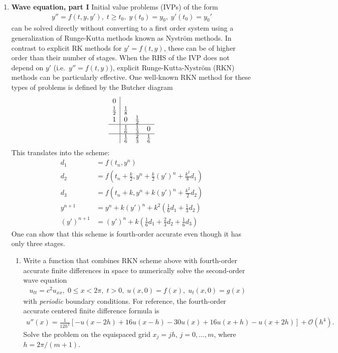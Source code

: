 \documentclass[final,oneside,onecolumn]{article}
\begin{document}
\begin{enumerate}
 \item \textbf{Wave equation, part I} Initial value problems (IVPs) of the form 
 \begin{align*}
 y'' = f(t,y,y'),\; t \geq t_0,\; y(t_0)=y_0,\; y'(t_0) = y_0'
 \end{align*}
 can be solved directly without converting to a first order system using a generalization of Runge-Kutta methods known as Nystr\"om methods. In contrast to explicit RK methods for $y'=f(t,y)$, these can be of higher order than  their number of stages.  When the RHS of the IVP does not depend on $y'$ (i.e.\ $y'' = f(t,y)$), explicit Runge-Kutta-Nystr\"om (RKN) methods can be particularly effective. One well-known RKN method for these types of problems is defined by the Butcher diagram
 \begin{equation*}
 \renewcommand{\arraystretch}{1.1}
 \begin{array}{c|ccc}
 0 & \\
 \frac{1}{2} & \frac{1}{8} \\
 1 & 0 & \frac{1}{2} \\
 \hline
   & \frac{1}{6} & \frac{1}{3} & 0 \\
 \hline
   & \frac{1}{6} & \frac{2}{3} & \frac{1}{6}
 \end{array}
 \end{equation*}
 This translates into the scheme:
 \begin{align*}
 d_1 &= f(t_n, y^{n})  \\
 d_2 &= f\left(t_n+\frac{k}{2}, y^{n}+\frac{k}{2} (y')^n + \frac{k^2}{8}d_1\right) \\
 d_3 &= f\left(t_n+k, y^{n}+k (y')^n +\frac{k^2}{2}d_2\right) \\
 y^{n+1} &= y^{n} + k (y')^n + k^2\left(\frac{1}{6}d_1 + \frac{1}{3}d_2\right) \\
 (y')^{n+1} &= (y')^{n} + k\left(\frac{1}{6}d_1 + \frac{2}{3}d_2 + \frac{1}{6} d_3 \right)
 \end{align*}
 One can show that this scheme is fourth-order accurate even though it has only three stages.
 
 \begin{enumerate}
\item Write a function that combines RKN scheme above with fourth-order accurate finite differences in space to numerically solve the second-order wave equation
 \begin{align}
 u_{tt} = c^2 u_{xx},\; 0 \leq x < 2\pi,\; t> 0,\; u(x,0) = f(x),\; u_t(x,0) = g(x)
 \label{eq:wave_eq}
 \end{align}
with \emph{periodic} boundary conditions.  For reference, the fourth-order accurate centered finite difference formula is
\begin{align*}
u''(x) = \frac{1}{12h^2}\left[-u(x-2h) + 16 u(x-h) - 30 u(x) + 16 u(x+h) - u(x+2h)\right] + \mathcal{O}(h^4).
\end{align*}
Solve the problem on the equispaced grid $x_j = jh$, $j=0,\ldots,m$, where $h=2\pi/(m+1)$.
\bigbreak


\end{enumerate}
\end{enumerate}
\end{document}
